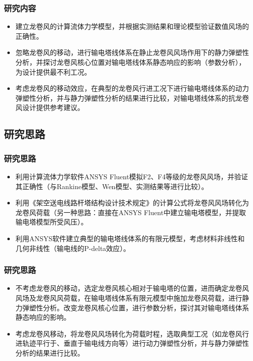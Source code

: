 \documentclass[]{beamer}
\begin{document}
\begin{frame}
  \frametitle{研究内容}
  \begin{itemize}
  	\item<1->
  	建立龙卷风的计算流体力学模型，并根据实测结果和理论模型验证数值风场的正确性。
  	\item<2->
  	忽略龙卷风的移动，进行输电塔线体系在静止龙卷风风场作用下的静力弹塑性分析，并探讨龙卷风核心位置对输电塔线体系静态响应的影响（参数分析），为设计提供最不利工况。
  	\item<3->
  	考虑龙卷风的移动效应，在典型的龙卷风行进工况下进行输电塔线体系的动力弹塑性分析，并与静力弹塑性分析的结果进行比较，对输电塔线体系的抗龙卷风设计提供参考建议。
  \end{itemize}
\end{frame}

\subsection{研究思路}
\begin{frame}
  \frametitle{研究思路}
  \begin{itemize}
  	\item<1->
  	利用计算流体力学软件ANSYS Fluent模拟F2、F4等级的龙卷风风场，并验证其正确性（与Rankine模型、Wen模型、实测结果等进行比较）。
  	\item<2->
  	利用《架空送电线路杆塔结构设计技术规定》的计算公式将龙卷风风场转化为龙卷风荷载（另一种思路：直接在ANSYS Fluent中建立输电塔模型，并提取输电塔模型所受风压）。
  	\item<3->
  	利用ANSYS软件建立典型的输电塔线体系的有限元模型，考虑材料非线性和几何非线性（输电线的P-delta效应）。
  \end{itemize}  
\end{frame}

\begin{frame}
	\frametitle{研究思路}
	\begin{itemize}
		\item<1->	不考虑龙卷风的移动，选定龙卷风核心相对于输电塔的位置，进而确定龙卷风风场及龙卷风风荷载，在输电塔线体系有限元模型中施加龙卷风荷载，进行静力弹塑性分析。改变龙卷风核心位置，进行参数分析，探讨其对输电塔线体系静态响应的影响。
		\item<2->
		考虑龙卷风移动，将龙卷风风场转化为荷载时程，选取典型工况（如龙卷风行进轨迹平行于、垂直于输电线方向等）进行动力弹塑性分析，并与静力弹塑性分析的结果进行比较。
	\end{itemize}  
\end{frame}
\end{document}
